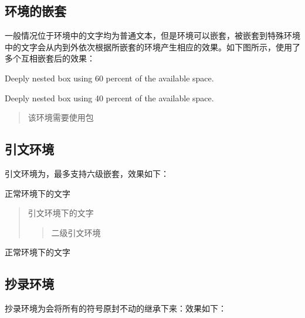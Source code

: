     \subsection{环境的嵌套}

    一般情况位于环境中的文字均为普通文本，但是环境可以嵌套，被嵌套到特殊环境中的文字会从内到外依次根据所嵌套的环境产生相应的效果。如下图所示，使用了多个互相嵌套后的效果：

    \begin{texshow}
        \begin{tcolorbox}[title=Outer box]
            \begin{tcolorbox}[title=Inner box]

                \begin{tcolorbox}[colframe=red,beforeafter skip=0pt]
                Deeply nested box using 60 percent of the available space.
                \end{tcolorbox}

                \begin{tcolorbox}[colframe=red,beforeafter skip=0pt]
                Deeply nested box using 40 percent of the available space.
                \end{tcolorbox}
            \end{tcolorbox}
        \end{tcolorbox}
    \end{texshow}

    \begin{quotation}
        该环境需要使用包
    \end{quotation}


    \subsection{引文环境}
    引文环境为，最多支持六级嵌套，效果如下：
    \begin{texshow}
        正常环境下的文字
        \begin{quotation}
            引文环境下的文字
            \begin{quotation}
                二级引文环境
            \end{quotation}
        \end{quotation}
        正常环境下的文字
    \end{texshow}
    \subsection{抄录环境}
    抄录环境为会将所有的符号原封不动的继承下来：效果如下：


